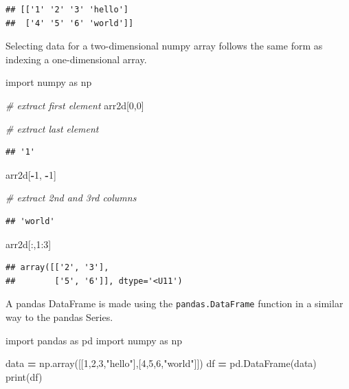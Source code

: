 \documentclass[
]{book}
\newenvironment{Shaded}{\begin{snugshade}}{\end{snugshade}}
\newcommand{\BuiltInTok}[1]{#1}
\newcommand{\CommentTok}[1]{\textcolor[rgb]{0.56,0.35,0.01}{\textit{#1}}}
\newcommand{\DecValTok}[1]{\textcolor[rgb]{0.00,0.00,0.81}{#1}}
\newcommand{\ImportTok}[1]{#1}
\newcommand{\NormalTok}[1]{#1}
\newcommand{\OperatorTok}[1]{\textcolor[rgb]{0.81,0.36,0.00}{\textbf{#1}}}
\newcommand{\StringTok}[1]{\textcolor[rgb]{0.31,0.60,0.02}{#1}}
\begin{document}
\begin{verbatim}
## [['1' '2' '3' 'hello']
##  ['4' '5' '6' 'world']]
\end{verbatim}

Selecting data for a two-dimensional numpy array follows the same form as indexing a one-dimensional array.

\begin{Shaded}
\begin{Highlighting}[]
\ImportTok{import}\NormalTok{ numpy }\ImportTok{as}\NormalTok{ np}

\CommentTok{\# extract first element }
\NormalTok{arr2d[}\DecValTok{0}\NormalTok{,}\DecValTok{0}\NormalTok{]}

\CommentTok{\# extract last element }
\end{Highlighting}
\end{Shaded}

\begin{verbatim}
## '1'
\end{verbatim}

\begin{Shaded}
\begin{Highlighting}[]
\NormalTok{arr2d[}\OperatorTok{{-}}\DecValTok{1}\NormalTok{, }\OperatorTok{{-}}\DecValTok{1}\NormalTok{]}

\CommentTok{\# extract 2nd and 3rd columns}
\end{Highlighting}
\end{Shaded}

\begin{verbatim}
## 'world'
\end{verbatim}

\begin{Shaded}
\begin{Highlighting}[]
\NormalTok{arr2d[:,}\DecValTok{1}\NormalTok{:}\DecValTok{3}\NormalTok{]}
\end{Highlighting}
\end{Shaded}

\begin{verbatim}
## array([['2', '3'],
##        ['5', '6']], dtype='<U11')
\end{verbatim}

A pandas DataFrame is made using the \texttt{pandas.DataFrame} function in a similar way to the pandas Series.

\begin{Shaded}
\begin{Highlighting}[]
\ImportTok{import}\NormalTok{ pandas }\ImportTok{as}\NormalTok{ pd}
\ImportTok{import}\NormalTok{ numpy }\ImportTok{as}\NormalTok{ np}

\NormalTok{data }\OperatorTok{=}\NormalTok{ np.array([[}\DecValTok{1}\NormalTok{,}\DecValTok{2}\NormalTok{,}\DecValTok{3}\NormalTok{,}\StringTok{"hello"}\NormalTok{],[}\DecValTok{4}\NormalTok{,}\DecValTok{5}\NormalTok{,}\DecValTok{6}\NormalTok{,}\StringTok{"world"}\NormalTok{]])}
\NormalTok{df }\OperatorTok{=}\NormalTok{ pd.DataFrame(data)}
\BuiltInTok{print}\NormalTok{(df)}
\end{Highlighting}
\end{Shaded}
\end{document}
